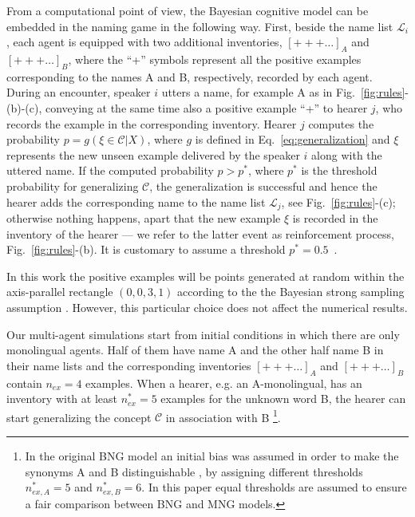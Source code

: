 \documentclass[review]{elsarticle}
\newcommand{\+}{\! + \!}
\renewcommand{\L}{{\mathcal{L}}}
\begin{document}
From a computational point of view, the Bayesian cognitive model can be embedded in the naming game in the following way. 
First, beside the name list $\L_i$, each agent  is equipped with two additional inventories, $[+++\dots]_A$ and $[+++\dots]_B$, where the ``+'' symbols represent all the positive examples corresponding to the names A and B, respectively, recorded by each agent. 
During an encounter, speaker $i$ utters a name, for example A as in Fig.~\ref{fig:rules}-(b)-(c), conveying at the same time also a positive example ``+'' to hearer $j$, who records the example in the corresponding inventory.
Hearer $j$ computes the probability $p = g(\xi \in \mathcal{C} | X)$, where $g$ is defined in Eq.~\eqref{eq:generalization} and $\xi$ represents the new unseen example delivered by the speaker $i$ along with the uttered name. 
If the computed probability $p > p^*$, where  $p^*$ is the threshold probability for generalizing $\mathcal{C}$, the generalization is successful and hence the hearer adds the corresponding name to the name list $\L_j$, see Fig.~\ref{fig:rules}-(c);
otherwise nothing happens, apart that the new example $\xi$ is recorded in the inventory of the hearer --- we refer to the latter event as reinforcement process, Fig.~\ref{fig:rules}-(b).
It is customary to assume a threshold $p^* = 0.5$~\cite{Tenenbaum-1999}. 

In this work the positive examples will be points generated at random within the axis-parallel rectangle $\left( 0, 0,  3,  1 \right)$ according to the the Bayesian strong sampling assumption \cite{Tenenbaum-1999, Marchetti-2020a, Marchetti-2020b}. 
However, this particular choice does not affect the numerical results. 

Our multi-agent simulations start from initial conditions in which there are only monolingual agents. 
Half of them have name A and the other half name B in their name lists and the corresponding inventories $[+++\dots]_A$ and $[+++\dots]_B$ contain $n_{ex}=4$ examples.
When a hearer, e.g. an A-monolingual, has an inventory with at least $n^{\ast}_{ex}=5$ examples for the unknown word B, the hearer can start generalizing the concept $\mathcal{C}$ in association with B \footnote{In the original BNG model \cite{Marchetti-2020a, Marchetti-2020b} an initial bias was assumed in order to make the synonyms A and B distinguishable \cite{Edmonds2002}, by assigning different thresholds $n^{\ast}_{ex, A}=5$ and $n^{\ast}_{ex, B}=6$. In this paper equal thresholds are assumed to ensure a fair comparison between BNG and MNG models.}.
\end{document}
